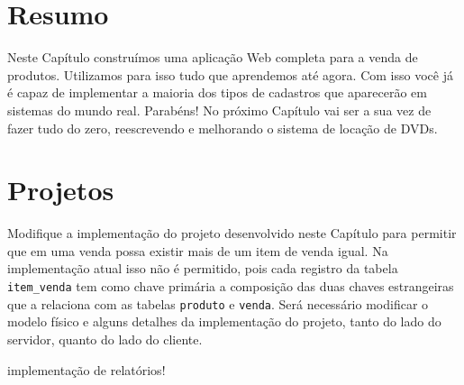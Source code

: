 

\section{Resumo}

Neste Capítulo construímos uma aplicação Web completa para a venda de produtos. Utilizamos para isso tudo que aprendemos até agora. Com isso você já é capaz de implementar a maioria dos tipos de cadastros que aparecerão em sistemas do mundo real. Parabéns! No próximo Capítulo vai ser a sua vez de fazer tudo do zero, reescrevendo e melhorando o sistema de locação de DVDs. 


\section{Projetos}

\begin{projetoSemArquivo}{}{}{}
    Modifique a implementação do projeto desenvolvido neste Capítulo para permitir que em uma venda possa existir mais de um item de venda igual. Na implementação atual isso não é permitido, pois cada registro da tabela \texttt{item\_venda} tem como chave primária a composição das duas chaves estrangeiras que a relaciona com as tabelas \texttt{produto} e \texttt{venda}. Será necessário modificar o modelo físico e alguns detalhes da implementação do projeto, tanto do lado do servidor, quanto do lado do cliente.
\end{projetoSemArquivo}

implementação de relatórios!
